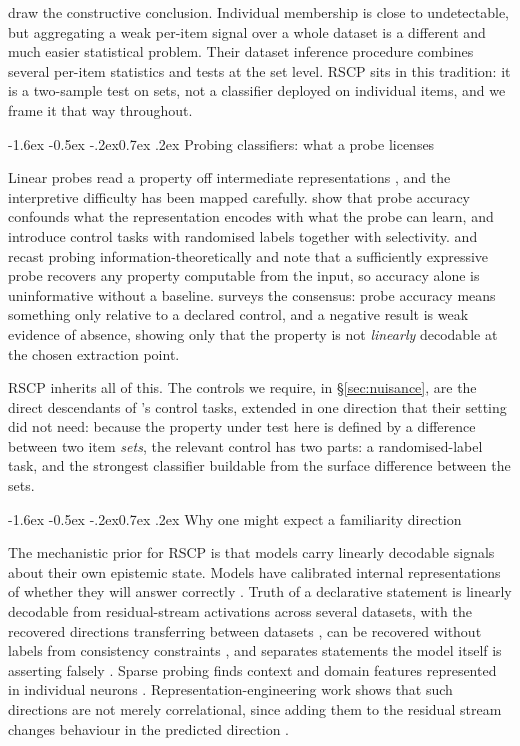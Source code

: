 \documentclass[10pt,twocolumn,letterpaper]{article}
\makeatletter
\renewcommand\subsection{\@startsection{subsection}{2}{\z@}%
  {-1.6ex \@plus -0.5ex \@minus -.2ex}{0.7ex \@plus .2ex}%
  {\normalfont\normalsize\bfseries}}
\makeatother
\begin{document}
\citet{maini2024datasetinference} draw the constructive conclusion. Individual membership is close to undetectable, but aggregating a weak per-item signal over a whole dataset is a different and much easier statistical problem. Their dataset inference procedure combines several per-item statistics and tests at the set level. RSCP sits in this tradition: it is a two-sample test on sets, not a classifier deployed on individual items, and we frame it that way throughout.

\subsection{Probing classifiers: what a probe licenses}

Linear probes read a property off intermediate representations \cite{alain2016probes}, and the interpretive difficulty has been mapped carefully. \citet{hewitt2019control} show that probe accuracy confounds what the representation encodes with what the probe can learn, and introduce control tasks with randomised labels together with selectivity. \citet{voita2020mdl} and \citet{pimentel2020info} recast probing information-theoretically and note that a sufficiently expressive probe recovers any property computable from the input, so accuracy alone is uninformative without a baseline. \citet{belinkov2022probing} surveys the consensus: probe accuracy means something only relative to a declared control, and a negative result is weak evidence of absence, showing only that the property is not \emph{linearly} decodable at the chosen extraction point.

RSCP inherits all of this. The controls we require, in \S\ref{sec:nuisance}, are the direct descendants of \citeauthor{hewitt2019control}'s control tasks, extended in one direction that their setting did not need: because the property under test here is defined by a difference between two item \emph{sets}, the relevant control has two parts: a randomised-label task, and the strongest classifier buildable from the surface difference between the sets.

\subsection{Why one might expect a familiarity direction}

The mechanistic prior for RSCP is that models carry linearly decodable signals about their own epistemic state. Models have calibrated internal representations of whether they will answer correctly \cite{kadavath2022know}. Truth of a declarative statement is linearly decodable from residual-stream activations across several datasets, with the recovered directions transferring between datasets \cite{marks2024geometry}, can be recovered without labels from consistency constraints \cite{burns2023dlk}, and separates statements the model itself is asserting falsely \cite{azaria2023internal}. Sparse probing finds context and domain features represented in individual neurons \cite{gurnee2023haystack}. Representation-engineering work shows that such directions are not merely correlational, since adding them to the residual stream changes behaviour in the predicted direction \cite{zou2023repe,rimsky2024caa}.
\end{document}
